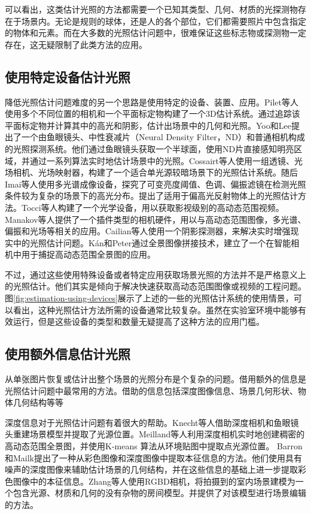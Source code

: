 可以看出，这类估计光照的方法都需要一个已知其类型、几何、材质的光探测物存在于场景内。无论是规则的球体，还是人的各个部位，它们都需要照片中包含指定的物体和元素。而在大多数的光照估计问题中，很难保证这些标志物或探测物一定存在，这无疑限制了此类方法的应用。

\subsection{使用特定设备估计光照}
降低光照估计问题难度的另一个思路是使用特定的设备、装置、应用。Pilet等人\cite{pilet2006all}使用多个不同位置的相机和一个平面标定物构建了一个3D估计系统。通过追踪该平面标定物并计算其中的高光和阴影，估计出场景中的几何和光照。Yoo和Lee\cite{yoo2008real}提出了一个由鱼眼镜头、中性衰减片（Neural Density Filter，ND）和普通相机构成的光照探测系统。他们通过鱼眼镜头获取一个半球面，使用ND片直接感知明亮区域，并通过一系列算法实时地估计场景中的光照。Cossairt\cite{cossairt2008light}等人使用一组透镜、光场相机、光场映射器，构建了一个适合单光源较暗场景下的光照估计系统。随后Imai等人\cite{imai2011estimation}使用多光谱成像设备，探究了可变亮度阈值、色调、偏振滤镜在检测光照条件较为复杂的场景下的高光分布。提出了适用于偏高光反射物体上的光照估计方法。Tocci等人\cite{tocci2011versatile}构建了一个光学设备，用以获取影视级别的高动态范围视频。Manakov等人\cite{manakov2013reconfigurable}提供了一个插件类型的相机硬件，用以与高动态范围图像，多光谱、偏振和光场等相关的应用。Cailian等人\cite{calian2013shading}使用一个阴影探测器，来解决实时增强现实中的光照估计问题。K\'an和Peter\cite{kan2015interactive}通过全景图像拼接技术，建立了一个在智能相机中用于捕捉高动态范围全景图的应用。

不过，通过这些使用特殊设备或者特定应用获取场景光照的方法并不是严格意义上的光照估计。他们其实是倾向于解决快速获取高动态范围图像或视频的工程问题。图\ref{fig:estimation-using-devices}展示了上述的一些的光照估计系统的使用情景，可以看出，这种光照估计方法所需的设备通常比较复杂。虽然在实验室环境中能够有效运行，但是这些设备的类型和数量无疑提高了这种方法的应用门槛。

\subsection{使用额外信息估计光照}
从单张图片恢复或估计出整个场景的光照分布是个复杂的问题。借用额外的信息是光照估计问题中最常用的方法。借助的信息包括深度图像信息、场景几何形状、物体几何结构等等

深度信息对于光照估计问题有着很大的帮助。Knecht等人\cite{knecht2012reciprocal}借助深度相机和鱼眼镜头重建场景模型并提取了光源位置。Meilland等人\cite{meilland20133d}利用深度相机实时地创建稠密的高动态范围全景图，并使用K-means 算法从环境贴图中提取点光源位置。 Barron和Mailk\cite{barron2013intrinsic}提出了一种从彩色图像和深度图像中提取本征信息的方法。他们使用具有噪声的深度图像来辅助估计场景的几何结构，并在这些信息的基础上进一步提取彩色图像中的本征信息。Zhang等人\cite{zhang2016emptying}使用RGBD相机，将拍摄到的室内场景建模为一个包含光源、材质和几何的没有杂物的房间模型。并提供了对该模型进行场景编辑的方法。


